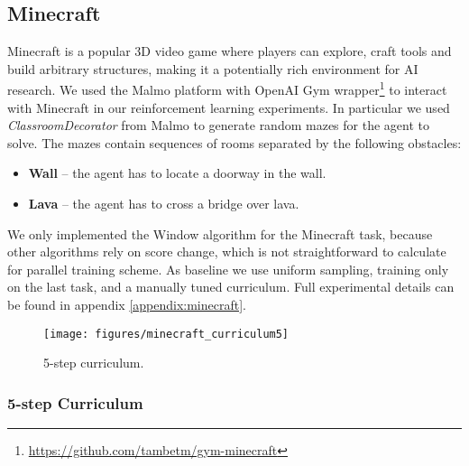 \documentclass{article}
\begin{document}
\subsection{Minecraft}

Minecraft is a popular 3D video game where players can explore, craft tools and build arbitrary structures, making it a potentially rich environment for AI research. We used the Malmo platform \citep{johnson2016malmo} with OpenAI Gym wrapper\footnote{\url{ https://github.com/tambetm/gym-minecraft}}
to interact with Minecraft in our reinforcement learning experiments. In particular we used \textit{ClassroomDecorator}
from Malmo to generate random mazes for the agent to solve. The mazes contain sequences of rooms separated by the following obstacles:
\begin{itemize}
\item  \textbf{Wall} -- the agent has to locate a doorway in the wall.

\item  \textbf{Lava} -- the agent has to cross a bridge over lava.



\end{itemize}

We only implemented the Window algorithm for the Minecraft task, because other algorithms rely on score change, which is not straightforward to calculate for parallel training scheme. As baseline we use uniform sampling, training only on the last task, and a manually tuned curriculum. Full experimental details can be found in appendix \ref{appendix:minecraft}.


\begin{wrapfigure}[3]{r}{0.5\textwidth}
  \begin{center}
    \texttt{[image: figures/minecraft\_curriculum5]}
  \end{center}
  \caption{5-step curriculum.}
  \label{5step}
\end{wrapfigure}

\subsubsection{5-step Curriculum}
\end{document}
